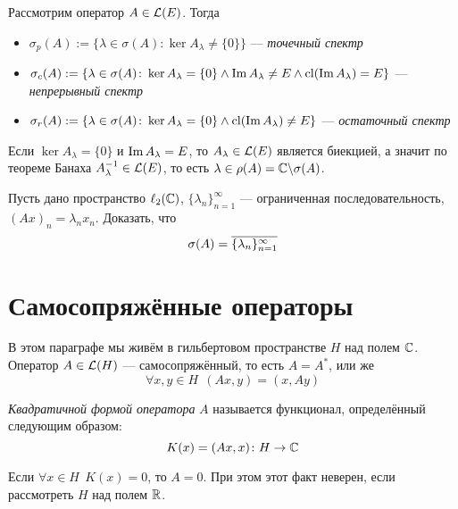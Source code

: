 \begin{definition}
	Рассмотрим оператор $A \in \mathcal{L}(E)$. Тогда
	\begin{itemize}
		\item $\sigma_p(A) := \{\lambda \in \sigma(A) \colon \ker A_\lambda \neq \{0\}\}$ --- \textit{точечный спектр}
		
		\item $\sigma_c(A) := \{\lambda \in \sigma(A) \colon \ker A_\lambda = \{0\} \wedge \operatorname{Im} A_\lambda \neq E \wedge \operatorname{cl} (\operatorname{Im} A_\lambda) = E\}$ --- \textit{непрерывный спектр}
		
		\item $\sigma_r(A) := \{\lambda \in \sigma(A) \colon \ker A_\lambda = \{0\} \wedge \operatorname{cl} (\operatorname{Im} A_\lambda) \neq E\}$ --- \textit{остаточный спектр}
	\end{itemize}
\end{definition}

\begin{note}
	Если $\ker A_\lambda = \{0\}$ и  $\operatorname{Im} A_\lambda = E$, то $A_\lambda \in \mathcal{L}(E)$ является биекцией, а значит по теореме Банаха $A_\lambda^{-1} \in \mathcal{L}(E)$, то есть $\lambda \in \rho(A) = \mathbb{C} \backslash \sigma(A)$.
\end{note}
	
\begin{exercise}
	Пусть дано пространство $\ell_2(\mathbb{C})$, $\{\lambda_n\}_{n = 1}^\infty$ --- ограниченная последовательность, $(Ax)_n = \lambda_nx_n$. Доказать, что
	\[
		\sigma(A) = \overline{\{\lambda_n\}_{n = 1}^\infty}
	\]
\end{exercise}

\section{Самосопряжённые операторы}

\begin{note}
	В этом параграфе мы живём в гильбертовом пространстве $H$ над полем $\mathbb{C}$. Оператор $A \in \mathcal{L}(H)$ --- самосопряжённый, то есть $A = A^*$, или же
	\[
		\forall x, y \in H\ \ (Ax, y) = (x, Ay)
	\]
\end{note}

\begin{definition}
	\textit{Квадратичной формой оператора} $A$ называется функционал, определённый следующим образом:
	\[
		K(x) = (Ax, x) \colon H \to \mathbb{C}
	\]
\end{definition}

\begin{exercise}
	Если $\forall x \in H\ \ K(x) = 0$, то $A = 0$. При этом этот факт неверен, если рассмотреть $H$ над полем $\mathbb{R}$.
\end{exercise}

